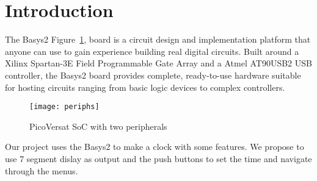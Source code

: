 \section{Introduction}

The Basys2 Figure~\ref{fig:basys2-0}, board is a circuit design and implementation platform that anyone can use to gain experience building real digital circuits. Built around a Xilinx Spartan-3E Field Programmable Gate Array and a Atmel AT90USB2 USB controller, the Basys2 board provides complete, ready-to-use hardware suitable for hosting circuits ranging from basic logic devices to complex controllers.


\begin{figure}[!htbp]
    \centerline{\texttt{[image: periphs]}}
    \vspace{0cm}\caption{PicoVersat SoC with two peripherals}
    \label{fig:basys2-0}
\end{figure}


Our project uses the Basys2 to make a clock with some features. We propose to use 7 segment dislay as output and the push buttons to set the time and navigate through the menus.

\noindent

